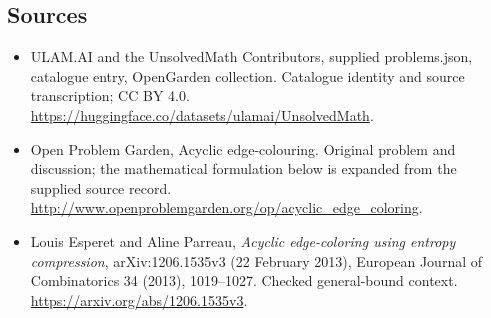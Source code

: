 \documentclass[11pt,a4paper]{article}
\begin{document}
\subsection{Sources}
\begin{itemize}
\item[S1] ULAM.AI and the UnsolvedMath Contributors, supplied problems.json, catalogue entry, OpenGarden collection. Catalogue identity and source transcription; CC BY 4.0.
\url{https://huggingface.co/datasets/ulamai/UnsolvedMath}.
\item[S2] Open Problem Garden, Acyclic edge-colouring. Original problem and discussion; the mathematical formulation below is expanded from the supplied source record.
\url{http://www.openproblemgarden.org/op/acyclic_edge_coloring}.
\item[S3] Louis Esperet and Aline Parreau, \emph{Acyclic edge-coloring using entropy compression}, arXiv:1206.1535v3 (22 February 2013), European Journal of Combinatorics 34 (2013), 1019--1027. Checked general-bound context.
\url{https://arxiv.org/abs/1206.1535v3}.
\end{itemize}
\end{document}
